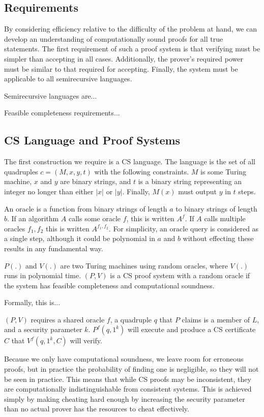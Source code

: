 \documentclass{article}
\begin{document}
\subsection{Requirements}
By considering efficiency relative to the difficulty of the problem at hand, we can develop an understanding of computationally sound proofs for all true statements. The first requirement of such a proof system is that verifying must be simpler than accepting in all cases. Additionally, the prover's required power must be similar to that required for accepting. Finally, the system must be applicable to all semirecursive languages.

Semirecursive languages are...

Feasible completeness requirements...

\subsection{CS Language and Proof Systems}

The first construction we require is a CS language. The language is the set of all quadruples $c = (M, x, y, t)$ with the following constraints. $M$ is some Turing machine, $x$ and $y$ are binary strings, and $t$ is a binary string representing an integer no longer than either $|x|$ or $|y|$. Finally, $M(x)$ must output $y$ in $t$ steps.

An oracle is a function from binary strings of length $a$ to binary strings of length $b$. If an algorithm $A$ calls some oracle $f$, this is written $A^f$. If $A$ calls multiple oracles $f_1, f_2$ this is written $A^{f_1,f_2}$. For simplicity, an oracle query is considered as a single step, although it could be polynomial in $a$ and $b$ without effecting these results in any fundamental way.

$P{(.)}$ and  $V{(.)}$ are two Turing machines using random oracles, where  $V{(.)}$ runs in polynomial time. $(P,V)$ is a CS proof system with a random oracle if the system has feasible completeness and computational soundness.

Formally, this is...

$(P,V)$ requires a shared oracle $f$, a quadruple $q$ that $P$ claims is a member of $L$, and a security parameter $k$. $P^f(q,1^k)$ will execute and produce a CS certificate $C$ that $V^f(q,1^k,C)$ will verify.

Because we only have computational soundness, we leave room for erroneous proofs, but in practice the probability of finding one is negligible, so they will not be seen in practice. This means that while CS proofs may be inconsistent, they are computationally indistinguishable from consistent systems. This is achieved simply by making cheating hard enough by increasing the security parameter than no actual prover has the resources to cheat effectively.
\end{document}
